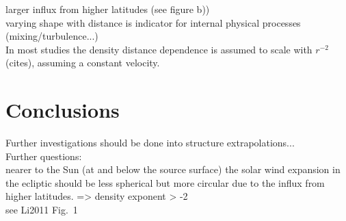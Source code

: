 larger influx from higher latitudes (see figure b))\\

varying shape with distance is indicator for internal physical processes (mixing/turbulence...)\\

In most studies the density distance dependence is assumed to scale with $r^{-2}$ (cites), assuming a constant velocity.\\


\section{Conclusions}

Further investigations should be done into structure extrapolations...\\

Further questions:\\
nearer to the Sun (at and below the source surface) the solar wind expansion in the ecliptic should be less spherical but more circular due to the influx from higher latitudes. => density exponent > -2\\
see Li2011 Fig.~1\\


